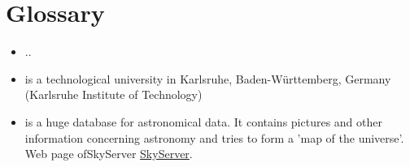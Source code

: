 \section{Glossary}





\printglossary

\begin{itemize}
  
  \item[\textbf{..}] .. \label{..}
  
  
  \item[\textbf{KIT}] is a technological university in Karlsruhe, Baden-Württemberg, Germany 
              (Karlsruhe Institute of Technology)\label{KIT}
  
  
  \item[\textbf{SkyServer}] is a huge database for astronomical data. It contains pictures
              and other information concerning astronomy and tries to form a 
              'map of the universe'. Web page of\label{SkyServer}{SkyServer}
               \href{http://skyserver.sdss.org/public/en/}{SkyServer}.
   
  
  
  
\end{itemize}